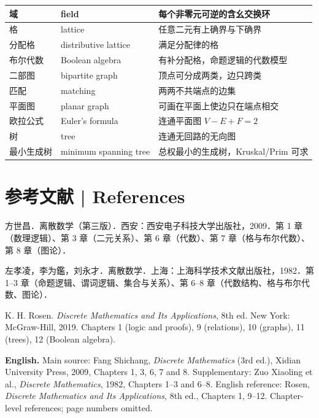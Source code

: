 \documentclass[UTF8,11pt,a4paper]{ctexart}
\newcommand{\EN}[1]{\par\noindent \textbf{English.} #1\par}
\begin{document}
\begin{longtable}{@{}>{\raggedright\arraybackslash}p{3.0cm}>{\raggedright\arraybackslash}p{4.9cm}>{\raggedright\arraybackslash}p{7.0cm}@{}}
\hline
域 & field & 每个非零元可逆的含幺交换环 \\
\hline
格 & lattice & 任意二元有上确界与下确界 \\
\hline
分配格 & distributive lattice & 满足分配律的格 \\
\hline
布尔代数 & Boolean algebra & 有补分配格，命题逻辑的代数模型 \\
\hline
二部图 & bipartite graph & 顶点可分成两类，边只跨类 \\
\hline
匹配 & matching & 两两不共端点的边集 \\
\hline
平面图 & planar graph & 可画在平面上使边只在端点相交 \\
\hline
欧拉公式 & Euler's formula & 连通平面图 $V-E+F=2$ \\
\hline
树 & tree & 连通无回路的无向图 \\
\hline
最小生成树 & minimum spanning tree & 总权最小的生成树，Kruskal/Prim 可求 \\
\hline
\end{longtable}
\normalsize
\section*{参考文献 | References}
\small
\noindent 方世昌．离散数学（第三版）．西安：西安电子科技大学出版社，2009．第 1 章（数理逻辑）、第 3 章（二元关系）、第 6 章（代数）、第 7 章（格与布尔代数）、第 8 章（图论）．\par
\noindent 左孝凌，李为鑑，刘永才．离散数学．上海：上海科学技术文献出版社，1982．第 1--3 章（命题逻辑、谓词逻辑、集合与关系）、第 6--8 章（代数结构、格与布尔代数、图论）．\par
\noindent K. H. Rosen. \emph{Discrete Mathematics and Its Applications}, 8th ed. New York: McGraw-Hill, 2019. Chapters 1 (logic and proofs), 9 (relations), 10 (graphs), 11 (trees), 12 (Boolean algebra).\par
\EN{Main source: Fang Shichang, \emph{Discrete Mathematics} (3rd ed.), Xidian University Press, 2009, Chapters 1, 3, 6, 7 and 8. Supplementary: Zuo Xiaoling et al., \emph{Discrete Mathematics}, 1982, Chapters 1--3 and 6--8. English reference: Rosen, \emph{Discrete Mathematics and Its Applications}, 8th ed., Chapters 1, 9--12. Chapter-level references; page numbers omitted.}
\end{document}
